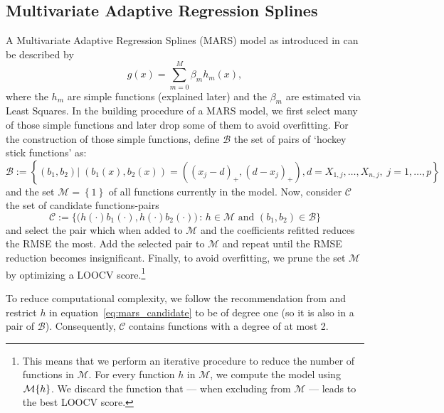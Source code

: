 \subsection{Multivariate Adaptive Regression Splines}{\label{sec:corr_model_MARS}
    A Multivariate Adaptive Regression Splines (MARS) model as introduced in \cite{friedmanMultivariateAdaptiveRegression1991} can be described by 
    \begin{equation}
        \label{eq:mars}
        g(x) = \sum_{m=0}^M \beta_m h_m(x),
    \end{equation}
    where the $h_m$ are simple functions (explained later) and the $\beta_m$ are estimated via Least Squares. 
    In the building procedure of a MARS model, we first select many of those simple functions and later drop some of them to avoid overfitting. For the construction of those simple functions, define $\mathcal{B}$ the set of pairs of `hockey stick functions' as:
    \begin{equation}
        \label{eq:mars_basis_fun}
        \mathcal{B}:=\left\{
            \left(b_1,b_2\right) 
            | \;
            \left(b_1(x),b_2(x)\right) = \left(\left(x_{j}-d\right)_+,\left(d-x_{j}\right)_+\right),
            d =X_{1, j},  \ldots, X_{n, j},\;
            j=1, \ldots, p
        \right\}
    \end{equation}
    and the set $\mathcal{M}=\left\{1\right\}$ of all functions currently in the model. Now, consider $\mathcal{C}$ the set of candidate functions-pairs 
    \begin{equation}
        \label{eq:mars_candidate}
        \mathcal{C}:=\Big\{
            \big(h(\cdot)b_1(\cdot),  h(\cdot)b_2(\cdot) \big)
            \,:\, h\in\mathcal{M} \text{ and } 
            (b_1,b_2) \in \mathcal{B}
        \Big\}
    \end{equation}
    and select the pair which when added to $\mathcal{M}$ and the coefficients refitted reduces the RMSE the most. Add the selected pair to $\mathcal{M}$ and repeat until the RMSE reduction becomes insignificant.
    Finally, to avoid overfitting, we prune the set $\mathcal{M}$ by optimizing a LOOCV score.\footnote{This means that we perform an iterative procedure to reduce the number of functions in $\mathcal{M}$. For every function $h$ in $\mathcal{M}$, we compute the model using $\mathcal{M}\\\{h\}$. We discard the function that --- when excluding from $\mathcal{M}$ --- leads to the best LOOCV score.}  

    To reduce computational complexity, we follow the recommendation from \cite{stephenEarthMultivariateAdaptive2021} and restrict $h$ in equation~\eqref{eq:mars_candidate} to be of degree one (so it is also in a pair of $\mathcal{B}$). Consequently, $\mathcal{C}$ contains functions with a degree of at most 2. 

}
